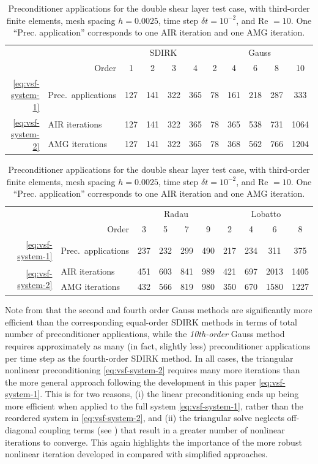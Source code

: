 \documentclass[review]{siamart}
\begin{document}
\begin{table}[h!]
	\centering
	\caption{Preconditioner applications for the double shear layer test case, with third-order
	finite elements, mesh spacing $h=0.0025$, time step $\delta t = 10^{-2}$, and Re $=10$. One
	``Prec. application'' corresponds to one AIR iteration and one AMG iteration.}
	\label{tab:dsl-iters}
	\begin{tabular}{rl|cccc|ccccc}
		\toprule
		&& \multicolumn{4}{c|}{SDIRK} & \multicolumn{5}{c}{Gauss} \\
		& \multicolumn{1}{r|}{Order}  & 1 & 2 & 3 & 4 & 2 & 4 & 6 & 8 & 10\\
		\midrule
		\eqref{eq:vsf-system-1} & Prec.\ applications & 127 & 141 & 322 & 365 & 78 & 161 & 218 & 287 & 333 \\
		\midrule
		\multirow{2}{*}{\eqref{eq:vsf-system-2}} & AIR iterations & 127 & 141 & 322 & 365 & 78 & 365 & 538 & 731 & 1064\\
		& AMG iterations & 127 & 141 & 322 & 365 & 78 & 368 & 562 & 766 & 1204 \\
		\bottomrule
	\end{tabular}

	\vspace{\floatsep}

	\begin{tabular}{rl|cccc|cccc}
		\toprule
		&& \multicolumn{4}{c|}{Radau} & \multicolumn{4}{c}{Lobatto} \\
		& \multicolumn{1}{r|}{Order} & 3 & 5 & 7 & 9 & 2 & 4 & 6 & 8\\
		\midrule
		\eqref{eq:vsf-system-1} & Prec.\ applications & 237 & 232 & 299 & 490 & 217 & 234 & 311 & 375 \\
		\midrule
		\multirow{2}{*}{\eqref{eq:vsf-system-2}} & AIR iterations & 451 & 603 & 841 & 989 & 421 & 697 & 2013 & 1405 \\
		& AMG iterations & 432 & 566 & 819 & 980 & 350 & 670 & 1580 & 1227\\
		\bottomrule
	\end{tabular}
\end{table}

Note from  that the second and fourth order Gauss methods
are significantly more efficient than the corresponding equal-order SDIRK
methods in terms of total number of preconditioner applications, while the
\textit{10th-order} Gauss method requires approximately as many (in fact,
slightly less) preconditioner applications per time step as the fourth-order
SDIRK method. In all cases, the triangular nonlinear preconditioning
\eqref{eq:vsf-system-2} requires many more iterations than the more general
approach following the development in this paper \eqref{eq:vsf-system-1}. This
is for two reasons, (i) the linear preconditioning ends up being more efficient
when applied to the full system \eqref{eq:vsf-system-1}, rather than the
reordered system in \eqref{eq:vsf-system-2}, and (ii) the triangular solve
neglects off-diagonal coupling terms (see ) that result
in a greater number of nonlinear iterations to converge. This again highlights
the importance of the more robust nonlinear iteration developed in
 compared with simplified approaches.
\end{document}
